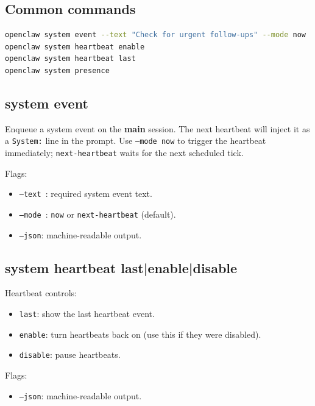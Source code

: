 \subsection{Common commands}


\begin{lstlisting}[language=bash]
openclaw system event --text "Check for urgent follow-ups" --mode now
openclaw system heartbeat enable
openclaw system heartbeat last
openclaw system presence
\end{lstlisting}


\subsection{system event}


Enqueue a system event on the \textbf{main} session. The next heartbeat will inject
it as a \texttt{System:} line in the prompt. Use \texttt{--mode now} to trigger the heartbeat
immediately; \texttt{next-heartbeat} waits for the next scheduled tick.

Flags:

\begin{itemize}
  \item \texttt{--text }: required system event text.
  \item \texttt{--mode }: \texttt{now} or \texttt{next-heartbeat} (default).
  \item \texttt{--json}: machine-readable output.
\end{itemize}


\subsection{system heartbeat last|enable|disable}


Heartbeat controls:

\begin{itemize}
  \item \texttt{last}: show the last heartbeat event.
  \item \texttt{enable}: turn heartbeats back on (use this if they were disabled).
  \item \texttt{disable}: pause heartbeats.
\end{itemize}


Flags:

\begin{itemize}
  \item \texttt{--json}: machine-readable output.
\end{itemize}


